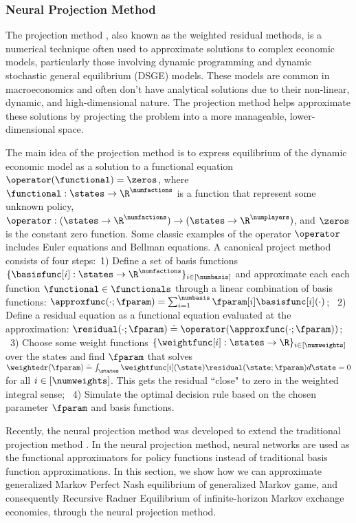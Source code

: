 \subsubsection{Neural Projection Method}
The projection method \cite{judd_projection_1992}, also known as the weighted residual methods, is a numerical technique often used to approximate solutions to complex economic models, particularly those involving dynamic programming and dynamic stochastic general equilibrium (DSGE) models. 
These models are common in macroeconomics and often don't have analytical solutions due to their non-linear, dynamic, and high-dimensional nature. The projection method helps approximate these solutions by projecting the problem into a more manageable, lower-dimensional space.

The main idea of the projection method is to express equilibrium of the dynamic economic model as a solution to a functional equation $\operator(\functional)=\zeros$, where 
$\functional: \states \to \R^\numfactions$ is a function that represent some unknown policy, 
$\operator: (\states\to \R^\numfactions) \to (\states \to \R^\numplayers)$, 
and
$\zeros$ is the constant zero function. Some classic examples of the operator $\operator$ includes Euler equations and Bellman equations.
A canonical project method consists of four steps:~1) Define a set of basis functions $\{\basisfunc[i]: \states \to \R^\numfactions\}_{i\in [\numbasis]}$ and approximate each each function $\functional\in \functionals$
through a linear combination of basis functions: $\approxfunc(\cdot;\fparam)=\sum_{i=1}^\numbasis \fparam[i]\basisfunc[i](\cdot)$;
~2) Define a residual equation as a functional equation evaluated at the approximation: $\residual(\cdot;\fparam)\doteq \operator(\approxfunc(\cdot; \fparam))$;
~3) Choose some weight functions $\{\weightfunc[i]: \states \to \R\}_{i\in [\numweights]}$ over the states and
find $\fparam$ that solves $\weightedr(\fparam)\doteq\int_{\states} \weightfunc[i](\state)\residual(\state; \fparam) d\state=0$ for all $i\in [\numweights]$. This gets the residual ``close" to zero in the weighted integral sense;
~4) Simulate the optimal decision rule based on the chosen parameter $\fparam$ and basis functions.


Recently, the neural projection method was developed to extend the traditional projection method \cite{maliar_deep_2021, azinovic2022deep, sauzet_projection_2021}. In the neural projection method, neural networks are used as the functional approximators for policy functions instead of traditional basis function approximations. 
In this section, we show how we can approximate generalized Markov Perfect Nash equilibrium of generalized Markov game, and consequently Recursive Radner Equilibrium of infinite-horizon Markov exchange economies, through the neural projection method.


